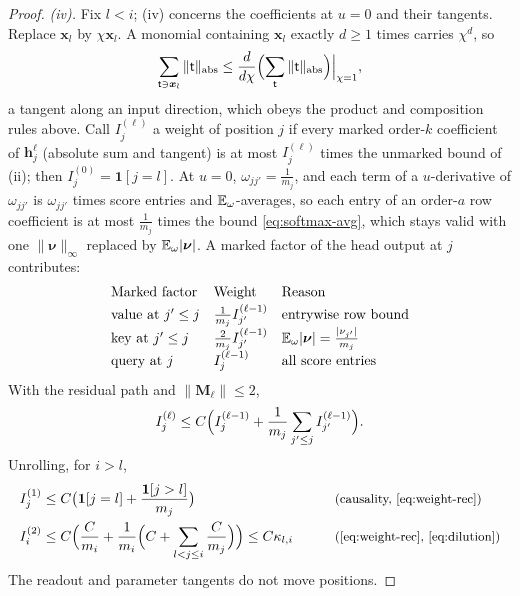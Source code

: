 \begin{proof}
\emph{(iv).} Fix $l<i$; (iv) concerns the coefficients at $u=0$ and their tangents. Replace $\bm x_l$ by $\chi\bm x_l$. A monomial containing $\bm x_l$
exactly $d\ge1$ times carries $\chi^d$, so
\[
 \sum_{\mathsf t\ni\bm x_l}\|\mathsf t\|_{\mathrm{abs}}\le\frac{d}{d\chi}\Bigl(\sum_{\mathsf t}\|\mathsf t\|_{\mathrm{abs}}\Bigr)\Big|_{\chi=1},
\]
a tangent along an input direction, which obeys the product and composition rules above. Call $I^{(\ell)}_j$ a weight of position $j$ if every
marked order-$k$ coefficient of $\bm h^\ell_j$ (absolute sum and tangent) is at most $I^{(\ell)}_j$ times the unmarked bound of (ii); then
$I^{(0)}_j=\mathbf 1[j=l]$. At $u=0$, $\omega_{jj'}=\frac{1}{m_j}$, and each term of a $u$-derivative of $\omega_{jj'}$ is $\omega_{jj'}$ times score entries and
$\mathbb E_\omega$-averages, so each entry of an order-$a$ row coefficient is at most $\frac{1}{m_j}$ times the bound \cref{eq:softmax-avg}, which stays
valid with one $\|\bm\nu\|_\infty$ replaced by $\mathbb E_\omega|\bm\nu|$. A marked factor of the head output at $j$ contributes:
\[
\begin{array}{@{}lll@{}}
 \text{Marked factor} & \text{Weight} & \text{Reason}\\[2pt]
 \text{value at }j'\le j & \frac{1}{m_j}I^{(\ell-1)}_{j'} & \text{entrywise row bound}\\[2pt]
 \text{key at }j'\le j & \frac{2}{m_j}I^{(\ell-1)}_{j'} & \E_\omega|\bm\nu|=\frac{|\nu_{j'}|}{m_j}\\[2pt]
 \text{query at }j & I^{(\ell-1)}_j & \text{all score entries}
\end{array}
\]
With the residual path and $\|\mathbf M_\ell\|\le2$,
\begin{equation}
 I^{(\ell)}_j\le C\Bigl(I^{(\ell-1)}_j+\frac{1}{m_j}\sum_{j'\le j}I^{(\ell-1)}_{j'}\Bigr).
 \label{eq:weight-rec}
\end{equation}
Unrolling, for $i>l$,
\begin{alignat*}{2}
 I^{(1)}_j&\le C\bigl(\mathbf 1[j=l]+\frac{\mathbf 1[j>l]}{m_j}\bigr) &\qquad& \why{causality, \cref{eq:weight-rec}}\\
 I^{(2)}_i&\le C\Bigl(\frac{C}{m_i}+\frac{1}{m_i}\Bigl(C+\sum_{l<j\le i}\frac{C}{m_j}\Bigr)\Bigr)\le C\kappa_{l,i} && \why{\cref{eq:weight-rec}, \cref{eq:dilution}}
\end{alignat*}
The readout and parameter tangents do not move positions.
\end{proof}

